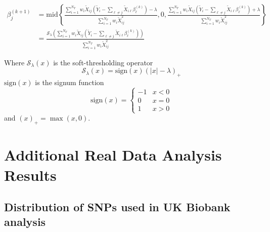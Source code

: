\documentclass[12pt,letter]{article}\usepackage[]{graphicx}\usepackage[]{color}
\newcommand{\tm}[1]{\textrm{{#1}}}
\newcommand{\Xtilde}{\widetilde{X}}
\newcommand{\Ytilde}{\widetilde{Y}}
\begin{document}
\begin{align}
	\beta_j^{(k+1)} & = \tm{mid}\left\lbrace \frac{  \sum_{i=1}^{N_T} w_i \Xtilde_{ij}\left(  \Ytilde_i - \sum_{\ell \neq j}\Xtilde_{i\ell} \beta_\ell^{(k)} \right) - \lambda}{\sum_{i=1}^{N_T} w_i \Xtilde_{ij}^2}, 0,\frac{  \sum_{i=1}^{N_T} w_i \Xtilde_{ij}\left(  \Ytilde_i - \sum_{\ell \neq j}\Xtilde_{i\ell} \beta_\ell^{(k)} \right) + \lambda}{\sum_{i=1}^{N_T} w_i \Xtilde_{ij}^2} \right\rbrace \nonumber \\
	& = \frac{\mathcal{S}_{\lambda}\left( \sum_{i=1}^{N_T} w_i \Xtilde_{ij}\left(  \Ytilde_i - \sum_{\ell \neq j}\Xtilde_{i\ell} \beta_\ell^{(k)} \right)\right) }{\sum_{i=1}^{N_T} w_i \Xtilde_{ij}^2} \label{eq:betaUpdateSoft2}
\end{align}

Where $\mathcal{S}_{\lambda}(x)$ is the soft-thresholding operator
\begin{equation*}
	\mathcal{S}_{\lambda}(x) = \tm{sign}(x)(|x| - \lambda)_+
\end{equation*}
$\textrm{sign}(x)$ is the signum function
\begin{equation*}
	\textrm{sign}(x) = \begin{cases}
		-1 & x<0\\
		0 & x= 0\\
		1 & x>0
	\end{cases}
\end{equation*}
and $(x)_+ = \max(x, 0)$.



\FloatBarrier

\newpage

\section{Additional Real Data Analysis Results} \label{ap:rda}

\subsection{Distribution of SNPs used in UK Biobank analysis}
\end{document}
